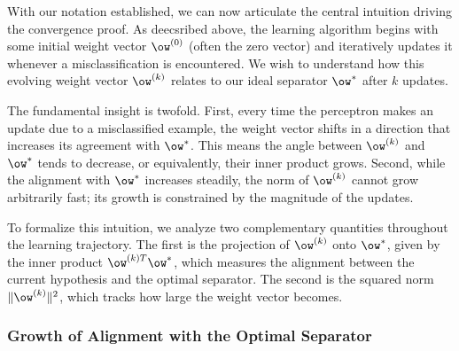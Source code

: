 \medskip

With our notation established, we can now articulate the central intuition driving the convergence proof. As deecsribed above, the learning algorithm begins with some initial weight vector $\ow^{(0)}$ (often the zero vector) and iteratively updates it whenever a misclassification is encountered. We wish to understand how this evolving weight vector $\ow^{(k)}$ relates to our ideal separator $\ow^*$ after $k$ updates.

The fundamental insight is twofold. First, every time the perceptron makes an update due to a misclassified example, the weight vector shifts in a direction that increases its agreement with $\ow^*$. This means the angle between $\ow^{(k)}$ and $\ow^*$ tends to decrease, or equivalently, their inner product grows. Second, while the alignment with $\ow^*$ increases steadily, the norm of $\ow^{(k)}$ cannot grow arbitrarily fast; its growth is constrained by the magnitude of the updates. 

To formalize this intuition, we analyze two complementary quantities throughout the learning trajectory. The first is the projection of $\ow^{(k)}$ onto $\ow^*$, given by the inner product $\ow^{(k)T}\ow^*$, which measures the alignment between the current hypothesis and the optimal separator. The second is the squared norm $\|\ow^{(k)}\|^2$, which tracks how large the weight vector becomes. %

\medskip
\subsubsection*{Growth of Alignment with the Optimal Separator}

